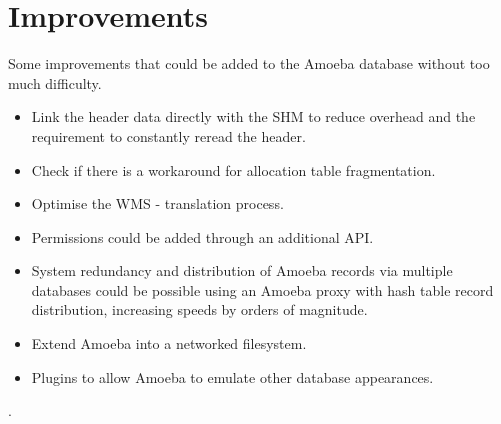 \documentclass[11pt]{article}
\begin{document}
\section{Improvements}
Some improvements that could be added to the Amoeba database without too much difficulty.
\begin{itemize}
\item Link the header data directly with the SHM to reduce overhead and the requirement to constantly reread the header. 
\item Check if there is a workaround for allocation table fragmentation. 
\item Optimise the WMS - translation process.
\item Permissions could be added through an additional API.
\item System redundancy and distribution of Amoeba records via multiple databases could be possible using an Amoeba proxy with hash table record distribution, increasing speeds by orders of magnitude.
\item Extend Amoeba into a networked filesystem.
\item Plugins to allow Amoeba to emulate other database appearances. 
\end{itemize}
\newpage
\noindent
\thispagestyle{empty}
\pagestyle{empty}
\pagecolor{black}
.
\end{document}

